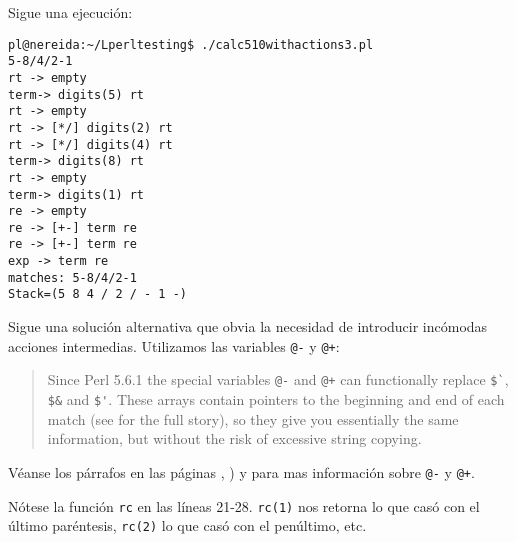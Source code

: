 \begin{rawhtml}
\end{rawhtml}

Sigue una ejecución:
\begin{verbatim}
pl@nereida:~/Lperltesting$ ./calc510withactions3.pl
5-8/4/2-1
rt -> empty
term-> digits(5) rt
rt -> empty
rt -> [*/] digits(2) rt
rt -> [*/] digits(4) rt
term-> digits(8) rt
rt -> empty
term-> digits(1) rt
re -> empty
re -> [+-] term re
re -> [+-] term re
exp -> term re
matches: 5-8/4/2-1
Stack=(5 8 4 / 2 / - 1 -)
\end{verbatim}


Sigue una solución alternativa que obvia la necesidad de introducir
incómodas acciones intermedias. Utilizamos 
las variables \verb|@-| y \verb|@+|:
 
\begin{it}\begin{quotation}
Since Perl 5.6.1 the special variables \verb|@-| and \verb|@+| can functionally replace
\verb|$`|, \verb|$&| and \verb|$'|. These arrays contain pointers to the beginning and end of
each match (see  for the full story), so they give you essentially
the same information, but without the risk of excessive string copying.
\end{quotation}\end{it}

Véanse los párrafos en las páginas
\pageref{parrafo:fincas}, \pageref{parrafo:iniciocas}) y
\pageref{parrafo:lastpar} para mas información sobre \verb|@-| y \verb|@+|.

Nótese la función \verb|rc| en las líneas
21-28. \verb|rc(1)| nos retorna lo que casó con el último paréntesis,
\verb|rc(2)| lo que casó con el penúltimo, etc.


